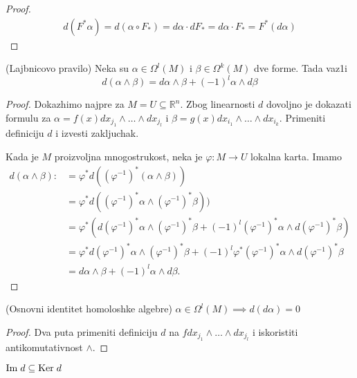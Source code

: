 \documentclass[a4paper,12pt]{article}
\newcommand{\RR}{\mathbb{R}}
\newcommand{\psj}{\subseteq}
\begin{document}
\begin{proof}
	\begin{align*}
		d(F^*\alpha) = d(\alpha\circ F_*) = d\alpha \cdot dF_* = d\alpha \cdot F_* = F^*(d\alpha)
	\end{align*}
\end{proof}

\begin{tvr} (Lajbnicovo pravilo)
Neka su $\alpha \in \Omega^l(M)$ i $\beta \in \Omega^k(M)$ dve forme. Tada vaz1i 
\[d(\alpha \wedge \beta) = d \alpha \wedge \beta + (-1)^l \alpha \wedge d \beta \]
\end{tvr}
\begin{proof}
Dokazhimo najpre za $M = U \psj \RR^n$. Zbog linearnosti $d$ dovoljno je dokazati formulu za $\alpha = f(x) dx_{j_1} \wedge \dots \wedge dx_{j_l}$ i $\beta = g(x) dx_{i_1} \wedge \dots \wedge dx_{i_k}$. 
	Primeniti definiciju $d$ i izvesti zakljuchak.

	Kada je $M$ proizvoljna mnogostrukost, neka je $\varphi:M\to U$ lokalna karta. Imamo
	\begin{align*}
		d(\alpha \wedge \beta) :&= \varphi^* d((\varphi^{-1})^* (\alpha \wedge \beta)) \\
		&= \varphi^* d((\varphi^{-1})^* \alpha \wedge(\varphi^{-1})^*  \beta)) \\
		&= \varphi^*( d(\varphi^{-1})^* \alpha \wedge(\varphi^{-1})^*  \beta + (-1)^l (\varphi^{-1})^* \alpha \wedge d(\varphi^{-1})^*  \beta) \\
		&= \varphi^* d(\varphi^{-1})^* \alpha \wedge(\varphi^{-1})^*  \beta + (-1)^l \varphi^* (\varphi^{-1})^* \alpha \wedge d(\varphi^{-1})^*  \beta \\
		&= d \alpha \wedge \beta + (-1)^l \alpha \wedge d \beta.
	\end{align*}
\end{proof}

\begin{tma}(Osnovni identitet homoloshke algebre) 
$\alpha \in \Omega^l(M) \implies d(d \alpha) = 0$
\end{tma}

\begin{proof}
Dva puta primeniti definiciju $d$ na $f dx_{j_1}\wedge \dots \wedge dx_{j_l} $ i iskoristiti antikomu\-tativnost $\wedge$.
\end{proof}

\begin{posl}
$\mathrm{Im} \hspace{0.1cm} d \psj \mathrm{Ker} \hspace{0.1cm} d$
\end{posl} 
\end{document}
